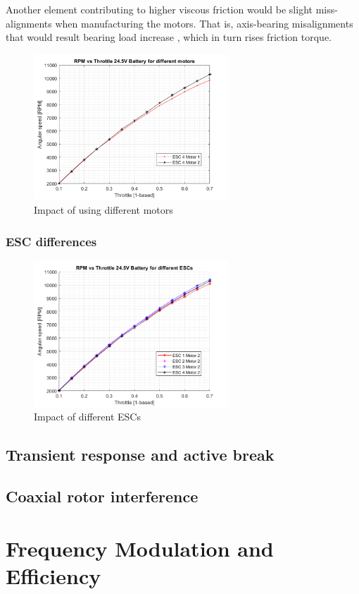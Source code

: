 Another element contributing to higher viscous friction would be slight miss-alignments when manufacturing the motors. That is, axis-bearing misalignments that would result bearing load increase , which in turn rises friction torque.


\begin{figure} 
    \centering
    \includegraphics[width=0.65\textwidth]{images/motor_discrepancy.png}
    \caption{Impact of using different motors}
    \label{fig:mot_discr}
\end{figure}


\subsubsection{ESC differences}

\begin{figure} 
    \centering
    \includegraphics[width=0.65\textwidth]{images/esc_discrepancy.png}
    \caption{Impact of different ESCs}
    \label{fig:esc_discr}
\end{figure}

\subsection{Transient response and active break}
\subsection{Coaxial rotor interference}


\section{Frequency Modulation and Efficiency}
